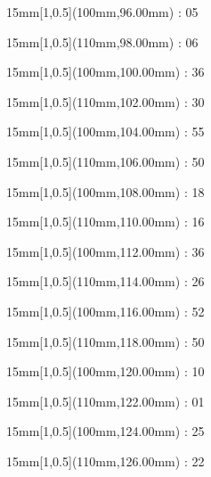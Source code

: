 \documentclass[a5paper]{memoir}
\begin{document}
\begin{textblock*}{15mm}[1,0.5](100mm,96.00mm) : 05\gridstrut\end{textblock*}
\begin{textblock*}{15mm}[1,0.5](110mm,98.00mm) : 06\gridstrut\end{textblock*}
\begin{textblock*}{15mm}[1,0.5](100mm,100.00mm) : 36\gridstrut\end{textblock*}
\begin{textblock*}{15mm}[1,0.5](110mm,102.00mm) : 30\gridstrut\end{textblock*}
\begin{textblock*}{15mm}[1,0.5](100mm,104.00mm) : 55\gridstrut\end{textblock*}
\begin{textblock*}{15mm}[1,0.5](110mm,106.00mm) : 50\gridstrut\end{textblock*}
\begin{textblock*}{15mm}[1,0.5](100mm,108.00mm) : 18\gridstrut\end{textblock*}
\begin{textblock*}{15mm}[1,0.5](110mm,110.00mm) : 16\gridstrut\end{textblock*}
\begin{textblock*}{15mm}[1,0.5](100mm,112.00mm) : 36\gridstrut\end{textblock*}
\begin{textblock*}{15mm}[1,0.5](110mm,114.00mm) : 26\gridstrut\end{textblock*}
\begin{textblock*}{15mm}[1,0.5](100mm,116.00mm) : 52\gridstrut\end{textblock*}
\begin{textblock*}{15mm}[1,0.5](110mm,118.00mm) : 50\gridstrut\end{textblock*}
\begin{textblock*}{15mm}[1,0.5](100mm,120.00mm) : 10\gridstrut\end{textblock*}
\begin{textblock*}{15mm}[1,0.5](110mm,122.00mm) : 01\gridstrut\end{textblock*}
\begin{textblock*}{15mm}[1,0.5](100mm,124.00mm) : 25\gridstrut\end{textblock*}
\begin{textblock*}{15mm}[1,0.5](110mm,126.00mm) : 22\gridstrut\end{textblock*}
\end{document}
